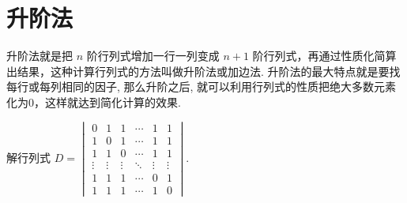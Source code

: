\section{升阶法}

升阶法就是把 $n$ 阶行列式增加一行一列变成 $n+1$ 阶行列式，再通过性质化简算出结果，这种计算行列式的方法叫做升阶法或加边法.
升阶法的最大特点就是要找每行或每列相同的因子, 那么升阶之后, 就可以利用行列式的性质把绝大多数元素化为0，这样就达到简化计算的效果.

\begin{example}
    解行列式 $D=\begin{vmatrix}
        0 & 1 & 1 & \cdots & 1 & 1 \\
        1 & 0 & 1 & \cdots & 1 & 1 \\
        1 & 1 & 0 & \cdots & 1 & 1 \\
        \vdots & \vdots & \vdots & \ddots & \vdots & \vdots \\
        1 & 1 & 1 & \cdots & 0 & 1 \\
        1 & 1 & 1 & \cdots & 1 & 0
    \end{vmatrix}$.
\end{example}

